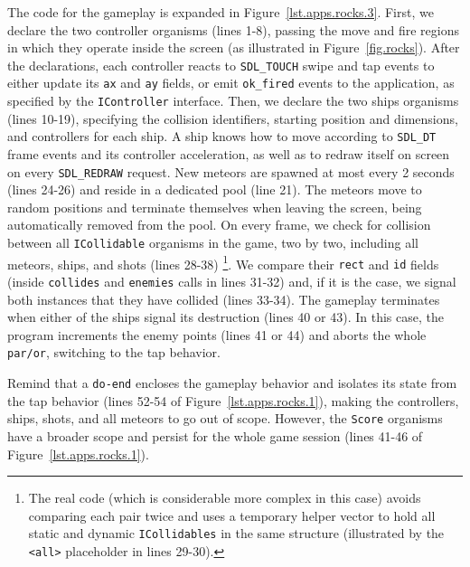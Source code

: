 \documentclass{sigplanconf}
\newcommand{\code}[1] {{\small{\texttt{#1}}}}
\newcommand{\1}{\;}
\newcommand{\2}{\;\;}
\newcommand{\3}{\;\;\;}
\newcommand{\5}{\;\;\;\;\;}
\begin{document}
The code for the gameplay is expanded in Figure~\ref{lst.apps.rocks.3}.
%
First, we declare the two controller organisms (lines 1-8), passing the move 
and fire regions in which they operate inside the screen (as illustrated in 
Figure~\ref{fig.rocks}).
After the declarations, each controller reacts to \code{SDL\_TOUCH} swipe and 
tap events to either update its \code{ax} and \code{ay} fields, or emit 
\code{ok\_fired} events to the application, as specified by the 
\code{IController} interface.
%
Then, we declare the two ships organisms (lines 10-19), specifying the 
collision identifiers, starting position and dimensions, and controllers for 
each ship.
A ship knows how to move according to \code{SDL\_DT} frame events and its 
controller acceleration, as well as to redraw itself on screen on every 
\code{SDL\_REDRAW} request.
%
New meteors are spawned at most every 2 seconds (lines 24-26) and reside in a 
dedicated pool (line 21).
The meteors move to random positions and terminate themselves when leaving the 
screen, being automatically removed from the pool.
%
On every frame, we check for collision between all \code{ICollidable} organisms 
in the game, two by two, including all meteors, ships, and shots (lines 
28-38)%
\footnote{
The real code (which is considerable more complex in this case) avoids 
comparing each pair twice and uses a temporary helper vector to hold all static 
and dynamic \code{ICollidables} in the same structure (illustrated by the 
\code{<all>} placeholder in lines 29-30).
}.
We compare their \code{rect} and \code{id} fields (inside \code{collides} and 
\code{enemies} calls in lines 31-32) and, if it is the case, we signal both
instances that they have collided (lines 33-34).
%
The gameplay terminates when either of the ships signal its destruction (lines 
40 or 43).
In this case, the program increments the enemy points (lines 41 or 44) and 
aborts the whole \code{par/or}, switching to the tap behavior.

Remind that a \code{do-end} encloses the gameplay behavior and isolates its 
state from the tap behavior (lines 52-54 of Figure~\ref{lst.apps.rocks.1}), 
making the controllers, ships, shots, and all meteors to go out of scope.
However, the \code{Score} organisms have a broader scope and persist for the 
whole game session (lines 41-46 of Figure~\ref{lst.apps.rocks.1}).
\end{document}
